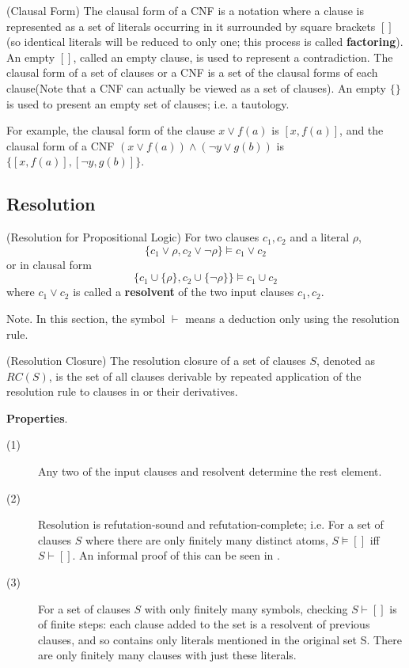\documentclass{article}
\begin{document}
\begin{defin}(Clausal Form)\newline
The clausal form of a CNF is a notation where a clause is represented as a set of literals occurring in it surrounded by square brackets $[]$(so identical literals will be reduced to only one; this process is called \textbf{factoring}). An empty $[]$, called an empty clause, is used to represent a contradiction. \newline
\noindent The clausal form of a set of clauses or a CNF is a set of the clausal forms of each clause(Note that a CNF can actually be viewed as a set of clauses). An empty $\{\}$ is used to present an empty set of clauses; i.e. a tautology.
\end{defin}

\noindent For example, the clausal form of the clause $x\vee f(a)$ is $[x,f(a)]$, and the clausal form  
of a CNF $(x \vee f(a)) \wedge (\neg y \vee g(b))$ is $\{[x,f(a)],[\neg y,g(b)]\}$.

\subsection{Resolution}

\begin{defin}(Resolution for Propositional Logic)\newline
For two clauses $c_1,c_2$ and a literal $\rho$,
\[
\{c_1 \vee \rho, c_2 \vee \neg \rho\}\vDash c_1 \vee c_2
\]
or in clausal form
\[
\{c_1 \cup \{\rho\}, c_2 \cup \{\neg \rho\}\} \vDash c_1 \cup c_2
\]
where $c_1\vee c_2$ is called a \textbf{resolvent} of the two input clauses $c_1,c_2$.
\end{defin}
\noindent Note. In this section, the symbol $\vdash$ means  a deduction only using the resolution rule. \newline

\begin{defin}(Resolution Closure)\newline
The resolution closure  of a set of clauses $S$, denoted as $RC(S)$,  is the set of all clauses derivable by repeated application of the resolution rule to clauses in  or their derivatives. 
\end{defin}


\noindent \textbf{Properties}.
\begin{description}
\item[(1)] Any two of the input clauses and resolvent determine the rest element.
\item[(2)] Resolution is refutation-sound and refutation-complete; i.e. For a set of clauses $S$ where there are only finitely many distinct atoms, $S\vDash []$ iff $S\vdash[]$. An informal proof of this can be seen in \cite{proof}.
\item[(3)] For a set of clauses $S$ with only finitely many symbols, checking $S\vdash []$ is of finite steps: each clause added to the set is a resolvent of previous clauses, and so contains only literals mentioned in the original set S. There are only finitely many clauses with just these literals.
\end{description}
\end{document}
